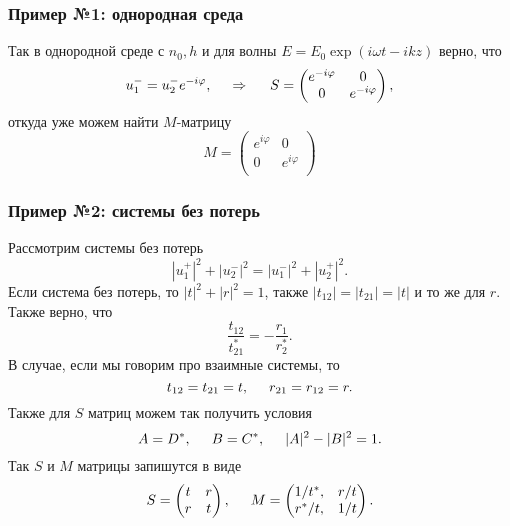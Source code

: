 \subsubsection*{Пример №1: однородная среда}
Так в однородной среде с $n_0, h$ и для волны $E = E_0 \exp(i \omega t - i k z)$  верно, что
\begin{equation*}
    u_1^- = u_2^- e^{-i \varphi},
    \hspace{0.5cm} \Rightarrow \hspace{0.5cm}
    S = \begin{pmatrix}
        e^{-i \varphi} & 0 \\
        0 & e^{-i\varphi}
    \end{pmatrix},
\end{equation*}
откуда уже можем найти $M$-матрицу
\begin{equation*}
    M = \begin{pmatrix}
        e^{i \varphi} & 0 \\
        0 & e^{i \varphi} \\
    \end{pmatrix}
\end{equation*}





\subsubsection*{Пример №2: системы без потерь}

Рассмотрим системы без потерь
\begin{equation*}
    |u_1^+|^2 + |u_2^-|^2 = |u_1^-|^2 + |u_2^+|^2.
\end{equation*}
Если система без потерь, то $|t|^2 + |r|^2 = 1$, также $|t_{12}| = |t_{21}| = |t|$ и то же для $r$. Также верно, что
\begin{equation*}
    \frac{t_{12}}{t_{21}^*} = - \frac{r_1}{r_2^*}.
\end{equation*}
В случае, если мы говорим про взаимные системы, то
\begin{equation*}
    t_{12} = t_{21} = t, \hspace{5 mm} r_{21} = r_{12} = r. 
\end{equation*}
Также для $S$ матриц можем так получить условия
\begin{equation*}
    A = D^*, \hspace{5 mm} B=C^*, \hspace{5 mm}  |A|^2 - |B|^2 = 1.
\end{equation*}
Так $S$ и $M$ матрицы запишутся в виде
\begin{equation*}
    S = \begin{pmatrix}
        t & r  \\ 
        r & t  \\
    \end{pmatrix},
    \hspace{5 mm} 
    M = \begin{pmatrix}
        1/t^*, & r/t \\
        r^*/t, & 1/t
    \end{pmatrix}.
\end{equation*}




